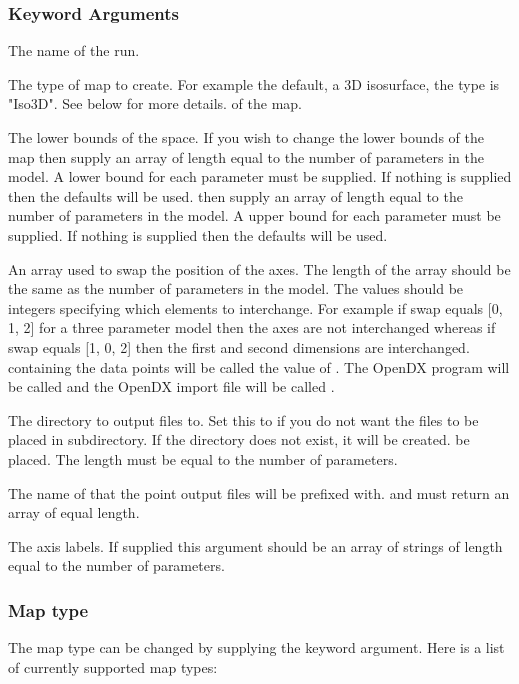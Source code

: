 \subsubsection{Keyword Arguments}

  The name of the run.

  The type of map to create.  For example the default, a 3D isosurface, the type is "Iso3D".  See below for more details.
of the map.

  The lower bounds of the space.  If you wish to change the lower bounds of the map then supply an array of length equal to the number of parameters in the model.  A lower bound for each parameter must be supplied.  If nothing is supplied then the defaults will be used.
then supply an array of length equal to the number of parameters in the model.  A upper
bound for each parameter must be supplied.  If nothing is supplied then the defaults will
be used.

  An array used to swap the position of the axes.  The length of the array should be the same as the number of parameters in the model.  The values should be integers specifying which elements to interchange.  For example if swap equals [0, 1, 2] for a three parameter model then the axes are not interchanged whereas if swap equals [1, 0, 2] then the first and second dimensions are interchanged.
containing the data points will be called the value of 
.  The OpenDX program will be
called 
 and the OpenDX import file will be called 
.

  The directory to output files to.  Set this to 
 if you do not want the files to be placed in subdirectory.  If the directory does not exist, it will be created.
be placed.  The length must be equal to the number of parameters.

  The name of that the point output files will be prefixed with.
and must return an array of equal length.

  The axis labels.  If supplied this argument should be an array of strings of length equal to the number of parameters.

\subsubsection{Map type}

The map type can be changed by supplying the 
 keyword argument.  Here is a list of
currently supported map types:


